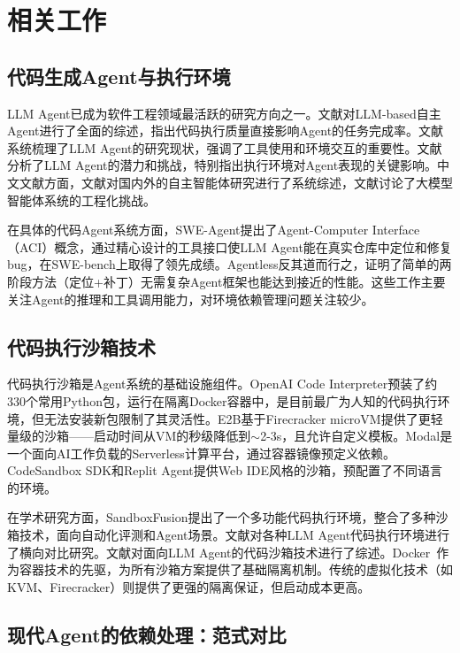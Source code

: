 \documentclass[10pt]{ctexart}
\begin{document}
\section{相关工作}

\subsection{代码生成Agent与执行环境}
LLM Agent已成为软件工程领域最活跃的研究方向之一。文献对LLM-based自主Agent进行了全面的综述，指出代码执行质量直接影响Agent的任务完成率。文献系统梳理了LLM Agent的研究现状，强调了工具使用和环境交互的重要性。文献分析了LLM Agent的潜力和挑战，特别指出执行环境对Agent表现的关键影响。中文文献方面，文献对国内外的自主智能体研究进行了系统综述，文献讨论了大模型智能体系统的工程化挑战。

在具体的代码Agent系统方面，SWE-Agent\cite{jimenez2024sweagent}提出了Agent-Computer Interface（ACI）概念，通过精心设计的工具接口使LLM Agent能在真实仓库中定位和修复bug，在SWE-bench\cite{yang2024swebench}上取得了领先成绩。Agentless\cite{liu2024agentless}反其道而行之，证明了简单的两阶段方法（定位+补丁）无需复杂Agent框架也能达到接近的性能。这些工作主要关注Agent的推理和工具调用能力，对环境依赖管理问题关注较少。

\subsection{代码执行沙箱技术}
代码执行沙箱是Agent系统的基础设施组件。OpenAI Code Interpreter\cite{openai2023code}预装了约330个常用Python包，运行在隔离Docker容器中，是目前最广为人知的代码执行环境，但无法安装新包限制了其灵活性。E2B\cite{e2b2024}基于Firecracker microVM\cite{agache2020firecracker}提供了更轻量级的沙箱——启动时间从VM的秒级降低到$\sim$2-3s，且允许自定义模板。Modal是一个面向AI工作负载的Serverless计算平台，通过容器镜像预定义依赖。CodeSandbox SDK\cite{codesandbox2024}和Replit Agent\cite{replit2024}提供Web IDE风格的沙箱，预配置了不同语言的环境。

在学术研究方面，SandboxFusion提出了一个多功能代码执行环境，整合了多种沙箱技术，面向自动化评测和Agent场景。文献对各种LLM Agent代码执行环境进行了横向对比研究。文献对面向LLM Agent的代码沙箱技术进行了综述。Docker~\cite{merkel2014docker}作为容器技术的先驱，为所有沙箱方案提供了基础隔离机制。传统的虚拟化技术（如KVM、Firecracker）则提供了更强的隔离保证，但启动成本更高。

\subsection{现代Agent的依赖处理：范式对比}
\end{document}
